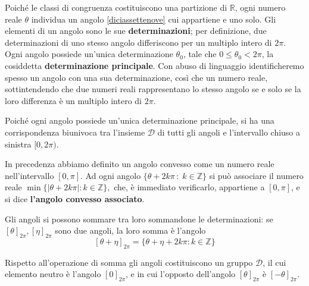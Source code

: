 \documentclass{article}
\theoremstyle{plain}
\theoremstyle{definition}
\theoremstyle{remark}
\begin{document}
\vspace{10pt}

Poiché le classi di congruenza costituiscono una partizione di $\mathbb{R}$, ogni numero reale $\theta$ 
individua un angolo \ref{diciassettenove} cui appartiene e uno solo. Gli elementi di un angolo sono le sue 
\textbf{determinazioni}; per definizione, due determinazioni di uno stesso angolo differiscono per un multiplo 
intero di $2\pi$. Ogni angolo possiede un'unica determinazione $\theta_0$, tale che 
$0 \leq \theta_0 < 2\pi$, la cosiddetta \textbf{determinazione principale}. Con abuso di linguaggio 
identificheremo spesso un angolo con una sua determinazione, così che un numero reale, sottintendendo 
che due numeri reali rappresentano lo stesso angolo se e solo se la loro differenza è un multiplo intero di $2\pi$.

\vspace{10pt}

Poiché ogni angolo possiede un'unica determinazione principale, si ha una corrispondenza biunivoca 
tra l'insieme $\mathcal{D}$ di tutti gli angoli e l'intervallo chiuso a sinistra $[0, 2\pi)$.

\vspace{10pt}

In precedenza abbiamo definito un angolo convesso come un numero reale nell'intervallo $[0, \pi]$. 
Ad ogni angolo $\{\theta + 2k\pi \,:\; k \in \mathbb{Z}\}$ si può associare il numero reale
\(\min\{|\theta + 2k\pi| : k \in \mathbb{Z}\},\)
che, è immediato verificarlo, appartiene a $[0, \pi]$, e si dice \textbf{l'angolo convesso associato}.

\vspace{10pt}

Gli angoli si possono sommare tra loro sommandone le determinazioni: se 
$[\theta]_{2\pi},[\eta]_{2\pi}$
sono due angoli, la loro somma è l'angolo
\[[\theta+\eta]_{2\pi}=\{\theta + \eta + 2k\pi : k \in \mathbb{Z}\}\]

\vspace{10pt}

Rispetto all'operazione di somma gli angoli costituiscono un gruppo $\mathcal{D}$, il cui elemento neutro 
è l'angolo $[0]_{2\pi}$, e in cui l'opposto dell'angolo $[\theta]_{2\pi}$ è $[-\theta]_{2\pi}$.

\vspace{10pt}
\end{document}
